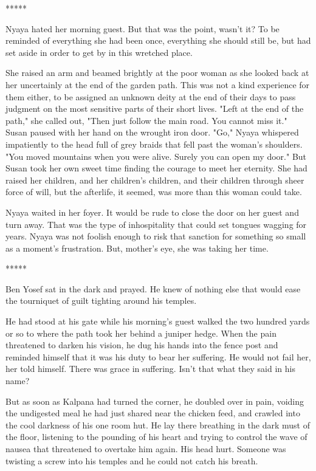 \documentclass{amsart}
\begin{document}
\begin{center} ***** \end{center}

Nyaya hated her morning guest. But that was the point, wasn't it? To be reminded of everything she had been once, everything she should still be, but had set aside in order to get by in this wretched place. 

She raised an arm and beamed brightly at the poor woman as she looked back at her uncertainly at the end of the garden path. This was not a kind experience for them either, to be assigned an unknown deity at the end of their days to pass judgment on the most sensitive parts of their short lives. "Left at the end of the path," she called out, "Then just follow the main road. You cannot miss it." Susan paused with her hand on the wrought iron door. "Go," Nyaya whispered impatiently to the head full of grey braids that fell past the woman's shoulders. "You moved mountains when you were alive. Surely you can open my door." But Susan took her own sweet time finding the courage to meet her eternity.  She had raised her children, and her children's children, and their children through sheer force of will, but the afterlife, it seemed, was more than this woman could take. 

Nyaya waited in her foyer. It would be rude to close the door on her guest and turn away. That was the type of inhospitality that could set tongues wagging for years. Nyaya was not foolish enough to risk that sanction for something so small as a moment's frustration. But, mother's eye, she was taking her time. 

\begin{center} ***** \end{center}

Ben Yosef sat in the dark and prayed. He knew of nothing else that would ease the tourniquet of guilt tighting around his temples. 

He had stood at his gate while his morning's guest walked the two hundred yards or so to where the path took her behind a juniper hedge. When the pain threatened to darken his vision, he dug his hands into the fence post and reminded himself that it was his duty to bear her suffering. He would not fail her, her told himself. There was grace in suffering. Isn't that what they said in his name? 

But as soon as Kalpana had turned the corner, he doubled over in pain, voiding the undigested meal he had just shared near the chicken feed, and crawled into the cool darkness of his one room hut. He lay there breathing in the dark must of the floor, listening to the pounding of his heart and trying to control the wave of nausea that threatened to overtake him again. His head hurt. Someone was twisting a screw into his temples and he could not catch his breath.
\end{document}
